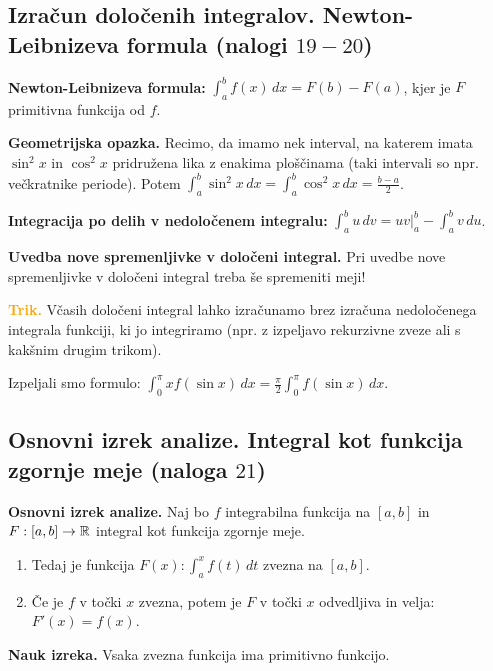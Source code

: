 {\color{Purple} \subsection*{Izračun določenih integralov. Newton-Leibnizeva formula (nalogi $19-20$)}}

\textbf{Newton-Leibnizeva formula:} $\displaystyle \int_{a}^{b} f(x) \,dx = F(b) - F(a)$, kjer je $F$ primitivna funkcija od $f$.

\textbf{Geometrijska opazka.} Recimo, da imamo nek interval, na katerem imata $\sin^2 x$ in $\cos^2 x$ pridružena lika z enakima ploščinama (taki intervali so npr. večkratnike periode). Potem $\displaystyle \int_{a}^{b} \sin^2 x \,dx = \int_{a}^{b} \cos^2 x \,dx = \frac{b-a}{2}$.

\textbf{Integracija po delih v nedoločenem integralu:} $\displaystyle \int_{a}^{b} u  \,dv = uv \big|_{a}^{b} -  \int_{a}^{b} v  \,du$.

\textbf{Uvedba nove spremenljivke v določeni integral.} Pri uvedbe nove spremenljivke v določeni integral treba še spremeniti meji!

\textbf{\textcolor{Orange}{Trik.}} Včasih določeni integral lahko izračunamo brez izračuna nedoločenega integrala funkciji, ki jo integriramo (npr. z izpeljavo rekurzivne zveze ali s kakšnim drugim trikom).

Izpeljali smo formulo: $\displaystyle \int_{0}^{\pi} x f(\sin x)  \,dx = \frac{\pi}{2} \int_{0}^{\pi} f(\sin x)  \,dx$.

{\color{Purple} \subsection*{Osnovni izrek analize. Integral kot funkcija zgornje meje (naloga $21$)}}

\textbf{Osnovni izrek analize.} Naj bo $f$ integrabilna funkcija na $[a,b]$ in $F:[a,b] \to \mathbb{R}$ integral kot funkcija zgornje meje.
\begin{enumerate}
    \item Tedaj je funkcija $\displaystyle F(x): \int_{a}^{x} f(t) \,dt$ zvezna na $[a,b]$.
    \item Če je $f$ v točki $x$ zvezna, potem je $F$ v točki $x$ odvedljiva in velja: $F'(x) = f(x)$.
\end{enumerate}

\textbf{Nauk izreka.} Vsaka zvezna funkcija ima primitivno funkcijo.

